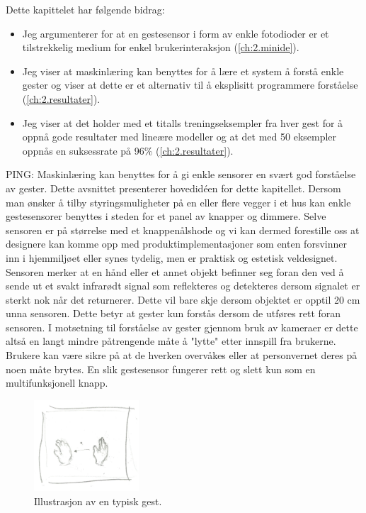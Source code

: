 Dette kapittelet har følgende bidrag:
\begin{itemize}
\item Jeg argumenterer for at en gestesensor i form av enkle fotodioder er et tilstrekkelig medium for enkel brukerinteraksjon (\ref{ch:2.minide}).
\item Jeg viser at maskinlæring kan benyttes for å lære et system å forstå enkle gester og viser at dette er et alternativ til å eksplisitt programmere forståelse (\ref{ch:2.resultater}).
\item Jeg viser at det holder med et titalls treningseksempler fra hver gest for å oppnå gode resultater med lineære modeller og at det med 50 eksempler oppnås en suksessrate på 96\% (\ref{ch:2.resultater}).
\end{itemize}

{\color{red}PING: Maskinlæring kan benyttes for å gi enkle sensorer en svært god forståelse av gester.}
Dette avsnittet presenterer hovedidéen for dette kapitellet. 
Dersom man ønsker å tilby styringsmuligheter på en eller flere vegger i et hus kan enkle gestesensorer benyttes i steden for et panel av knapper og dimmere. Selve sensoren er på størrelse med et knappenålshode og vi kan dermed forestille oss at designere kan komme opp med produktimplementasjoner som enten forsvinner inn i hjemmiljøet eller synes tydelig, men er praktisk og estetisk veldesignet. Sensoren merker at en hånd eller et annet objekt befinner seg foran den ved å sende ut et svakt infrarødt signal som reflekteres og detekteres dersom signalet er sterkt nok når det returnerer. Dette vil bare skje dersom objektet er opptil 20 cm unna sensoren. Dette betyr at gester kun forstås dersom de utføres rett foran sensoren. I motsetning til forståelse av gester gjennom bruk av kameraer er dette altså en langt mindre påtrengende måte å "lytte" etter innspill fra brukerne. Brukere kan være sikre på at de hverken overvåkes eller at personvernet deres på noen måte brytes. En slik gestesensor fungerer rett og slett kun som en multifunksjonell knapp.

\begin{figure}
    \vspace{-20pt}
  \begin{center}
    \includegraphics[width=0.35\textwidth]{fig/swipe-l-r}
  \end{center}
  \vspace{-20pt}
  \caption{Illustrasjon av en typisk gest.}
  \label{fig:gest}
  \vspace{-7pt}
\end{figure}

